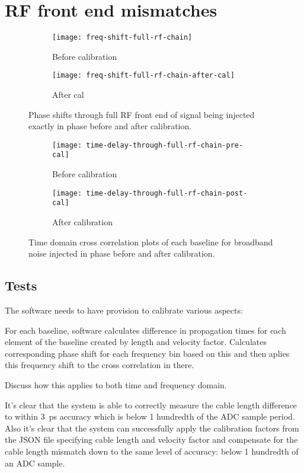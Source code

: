 \section{RF front end mismatches}

\begin{figure}
  \begin{subfigure}[b]{0.49\textwidth}
    \centering
    \texttt{[image: freq-shift-full-rf-chain]}
    \caption{Before calibration}
  \end{subfigure}
  \begin{subfigure}[b]{0.49\textwidth}
    \centering
    \texttt{[image: freq-shift-full-rf-chain-after-cal]}
    \caption{After cal}
  \end{subfigure}
  \caption{Phase shifts through full RF front end of signal being injected exactly in phase before and after calibration.}
\end{figure}
\begin{figure}
  \centering
  \begin{subfigure}[b]{0.49\textwidth}
    \centering
    \texttt{[image: time-delay-through-full-rf-chain-pre-cal]}
    \caption{Before calibration}
  \end{subfigure}
  \begin{subfigure}[b]{0.49\textwidth}
    \centering
    \texttt{[image: time-delay-through-full-rf-chain-post-cal]}
    \caption{After calibration}
  \end{subfigure}
  \caption{Time domain cross correlation plots of each baseline for broadband noise injected in phase before and after calibration.}
\end{figure}

\subsection{Tests}

The software needs to have provision to calibrate various aspects:

For each baseline, software calculates difference in propagation times for each element of the baseline created by length and velocity factor. Calculates corresponding phase shift for each frequency bin based on this and then aplies this frequency shift to the cross correlation in there.


Discuss how this applies to both time and frequency domain.


It's clear that the system is able to correctly measure the cable length difference to within \SI{3}{\pico\second} accuracy which is below 1 hundredth of the ADC sample period.
Also it's clear that the system can successfully apply the calibration factors from the JSON file specifying cable length and velocity factor and compensate for the cable length mismatch down to the same level of accuracy: below 1 hundredth of an ADC sample.


